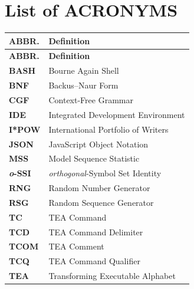 \documentclass[a4paper, 18pt]{book} %
\begin{document}
\chapter*{List of ACRONYMS}
\label{CHAPACRONYMNS}

\begin{longtable}{p{3cm} p{12cm}}
\textbf{ABBR.} & \textbf{Definition} \\
\hline
\endfirsthead

\textbf{ABBR.} & \textbf{Definition} \\
\hline
\endhead


\textbf{BASH} & Bourne Again Shell \\

\textbf{BNF} & Backus–Naur Form \\

\textbf{CGF} & Context-Free Grammar\\

\textbf{IDE} & Integrated Development Environment\\

\textbf{I*POW} & International Portfolio of Writers \\

\textbf{JSON} & JavaScript Object Notation \\

\textbf{MSS} & Model Sequence Statistic \\

\textbf{\textit{o}-SSI} & \textit{orthogonal}-Symbol Set Identity \\

\textbf{RNG} & Random Number Generator  \\

\textbf{RSG} & Random Sequence Generator  \\

\textbf{TC} & TEA Command \\

\textbf{TCD} & TEA Command Delimiter\\
 
\textbf{TCOM} & TEA Comment\\
 
\textbf{TCQ} & TEA Command Qualifier\\
 
\textbf{TEA} & Transforming Executable Alphabet\\
 

\end{longtable}
\end{document}
